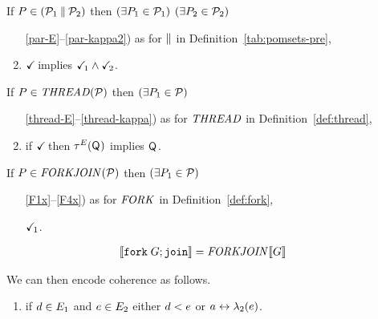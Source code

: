 

\begin{definition}$\phantom{\;}$\par

  \noindent
  If $\aPS\SB0 \in (\aPSS_1\sPAR\aPSS_2)$ then
  $(\exists\aPS_1\in\aPSS_1)$ $(\exists\aPS_2\in\aPSS_2)$
  \begin{enumerate}
    \setcounter{enumi}{\value{pomsetPreParCount}}
  \item[\ref{par-E}--\ref{par-kappa2})]
    as for $\sPAR$ in Definition~\ref{tab:pomsets-pre},
  \item \label{par-tick}
    $\TICK$ implies $\TICK_1\land\TICK_2$.
  \end{enumerate}

  \noindent
  If $\aPS\SB0 \in \sTHREAD{\aPSS}$ then
  $(\exists\aPS_1\in\aPSS)$
  \begin{enumerate}
    \setcounter{enumi}{\value{pomsetXThreadCount}}
  \item[\ref{thread-E}--\ref{thread-kappa})]
    as for $\sTHREAD{}$ in Definition~\ref{def:thread},
  \item if $\TICK$ then $\aTr[\aEvs](\Q{})$ implies $\Q{}$.
  \end{enumerate}    

  \noindent
  If $\aPS\SB0 \in \sFORKJOIN{\aPSS}$ then
  $(\exists\aPS_1\in\aPSS)$
  \begin{enumerate}
    \setcounter{enumi}{\value{pomsetXForkCount}}
  \item[\ref{F1x}--\ref{F4x})]
    as for $\sFORK{}$ in Definition~\ref{def:fork},
  \item[{\labeltext[F5]{F5)}{F5}}]
    $\TICK_1$.
  \end{enumerate}    
\end{definition}

\begin{align*}
  \sem{\FORKJOIN{\aGrp}} &= \sFORKJOIN{}\sem{\aGrp}  
\end{align*}

We can then encode coherence as follows.
\begin{enumerate}
  \setcounter{enumi}{\value{pomsetXSemiCount}}
\item if $\bEv\in\aEvs_1$ and $\aEv\in\aEvs_2$ either $\bEv<\SB0\aEv$ or $a\reorder\labeling_2(\aEv)$.
\end{enumerate}

